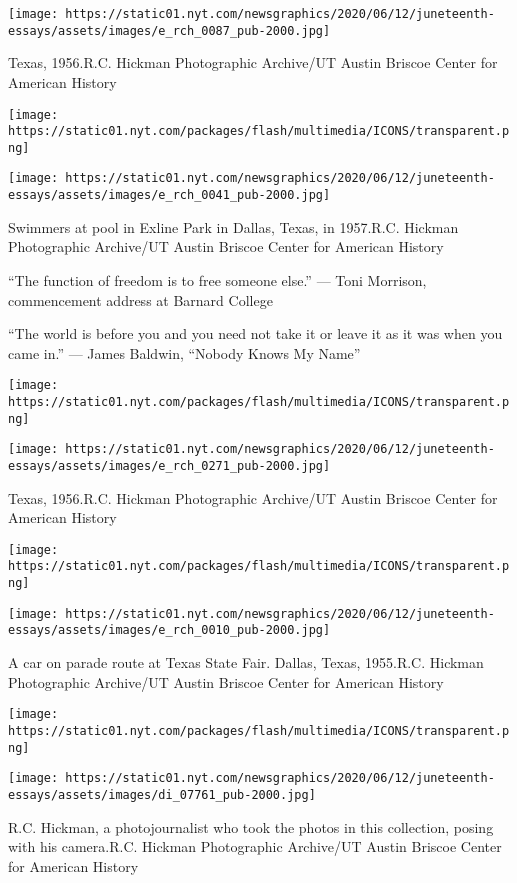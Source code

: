 \texttt{[image: https://static01.nyt.com/newsgraphics/2020/06/12/juneteenth-essays/assets/images/e\_rch\_0087\_pub-2000.jpg]}

Texas, 1956.R.C. Hickman Photographic Archive/UT Austin Briscoe Center
for American History

\texttt{[image: https://static01.nyt.com/packages/flash/multimedia/ICONS/transparent.png]}

\texttt{[image: https://static01.nyt.com/newsgraphics/2020/06/12/juneteenth-essays/assets/images/e\_rch\_0041\_pub-2000.jpg]}

Swimmers at pool in Exline Park in Dallas, Texas, in 1957.R.C. Hickman
Photographic Archive/UT Austin Briscoe Center for American History

``The function of freedom is to free someone else.'' --- Toni Morrison,
commencement address at Barnard College

``The world is before you and you need not take it or leave it as it was
when you came in.'' --- James Baldwin, ``Nobody Knows My Name''

\texttt{[image: https://static01.nyt.com/packages/flash/multimedia/ICONS/transparent.png]}

\texttt{[image: https://static01.nyt.com/newsgraphics/2020/06/12/juneteenth-essays/assets/images/e\_rch\_0271\_pub-2000.jpg]}

Texas, 1956.R.C. Hickman Photographic Archive/UT Austin Briscoe Center
for American History

\texttt{[image: https://static01.nyt.com/packages/flash/multimedia/ICONS/transparent.png]}

\texttt{[image: https://static01.nyt.com/newsgraphics/2020/06/12/juneteenth-essays/assets/images/e\_rch\_0010\_pub-2000.jpg]}

A car on parade route at Texas State Fair. Dallas, Texas, 1955.R.C.
Hickman Photographic Archive/UT Austin Briscoe Center for American
History

\texttt{[image: https://static01.nyt.com/packages/flash/multimedia/ICONS/transparent.png]}

\texttt{[image: https://static01.nyt.com/newsgraphics/2020/06/12/juneteenth-essays/assets/images/di\_07761\_pub-2000.jpg]}

R.C. Hickman, a photojournalist who took the photos in this collection,
posing with his camera.R.C. Hickman Photographic Archive/UT Austin
Briscoe Center for American History

\href{https://www.nytimes.com/2020/06/18/style/self-care/rachel-cargle-anti-racism-ally.html}{}


